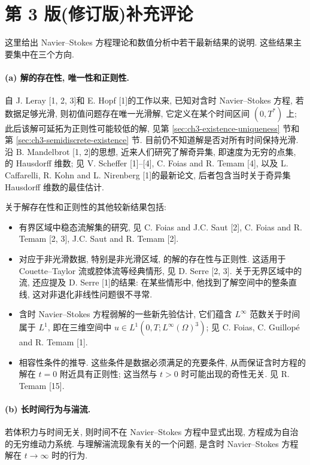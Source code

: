 \section*{第 3 版(修订版)补充评论}
\label{sec:additional-comments-third-edition}

这里给出 Navier--Stokes 方程理论和数值分析中若干最新结果的说明. 这些结果主要集中在三个方向.

\paragraph{(a) 解的存在性, 唯一性和正则性.}
自 J. Leray [1, 2, 3]和 E. Hopf [1]的工作以来, 已知对含时 Navier--Stokes 方程, 若数据足够光滑, 则初值问题存在唯一光滑解, 它定义在某个时间区间 $(0,T^*)$ 上; 此后该解可延拓为正则性可能较低的解, 见第 \ref{sec:ch3-existence-uniqueness} 节和第 \ref{sec:ch3-semidiscrete-existence} 节. 目前仍不知道解是否对所有时间保持光滑. 沿 B. Mandelbrot [1, 2]的思想, 近来人们研究了解奇异集, 即速度为无穷的点集, 的 Hausdorff 维数; 见 V. Scheffer [1]--[4], C. Foias and R. Temam [4], 以及 L. Caffarelli, R. Kohn and L. Nirenberg [1]的最新论文, 后者包含当时关于奇异集 Hausdorff 维数的最佳估计.

关于解存在性和正则性的其他较新结果包括:
\begin{itemize}
\item 有界区域中稳态流解集的研究, 见 C. Foias and J.C. Saut [2], C. Foias and R. Temam [2, 3], J.C. Saut and R. Temam [2].
\item 对应于非光滑数据, 特别是非光滑区域, 的解的存在性与正则性. 这适用于 Couette--Taylor 流或腔体流等经典情形, 见 D. Serre [2, 3]. 关于无界区域中的流, 还应提及 D. Serre [1]的结果: 在某些情形中, 他找到了解空间中的整条直线, 这对非退化非线性问题很不寻常.
\item 含时 Navier--Stokes 方程弱解的一些新先验估计, 它们蕴含 $L^\infty$ 范数关于时间属于 $L^1$, 即在三维空间中 $u\in L^1(0,T;L^\infty(\Omega)^3)$; 见 C. Foias, C. Guillopé and R. Temam [1].
\item 相容性条件的推导. 这些条件是数据必须满足的充要条件, 从而保证含时方程的解在 $t=0$ 附近具有正则性; 这当然与 $t>0$ 时可能出现的奇性无关. 见 R. Temam [15].
\end{itemize}

\paragraph{(b) 长时间行为与湍流.}
若体积力与时间无关, 则时间不在 Navier--Stokes 方程中显式出现, 方程成为自治的无穷维动力系统. 与理解湍流现象有关的一个问题, 是含时 Navier--Stokes 方程解在 $t\to\infty$ 时的行为.

